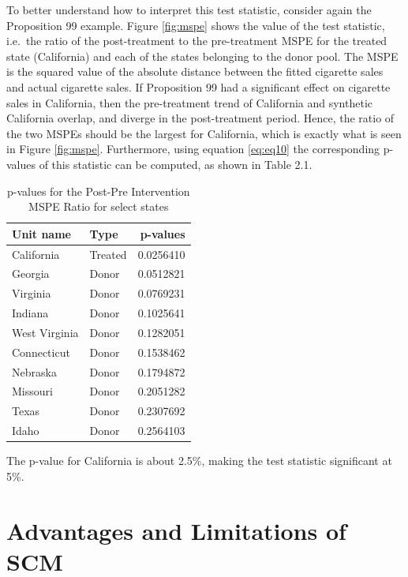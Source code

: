 \documentclass[12pt,nobind, a4paper]{reedthesis}
\begin{document}
 To better understand how to interpret this test statistic, consider again the Proposition 99 example. Figure \ref{fig:mspe} shows the value of the test statistic, i.e.~the ratio of the post-treatment to the pre-treatment MSPE for the treated state (California) and each of the states belonging to the donor pool. The MSPE is the squared value of the absolute distance between the fitted cigarette sales and actual cigarette sales. If Proposition 99 had a significant effect on cigarette sales in California, then the pre-treatment trend of California and synthetic California overlap, and diverge in the post-treatment period. Hence, the ratio of the two MSPEs should be the largest for California, which is exactly what is seen in Figure \ref{fig:mspe}. Furthermore, using equation \eqref{eq:eq10} the corresponding p-values of this statistic can be computed, as shown in Table 2.1.
 \begin{table}[h!!]
 \centering
 \begin{tabular}{llr}
 \hline
 \hline
 \textbf{Unit name} & \textbf{Type}&\textbf{p-values}\\
 \hline
 \hline
 California & Treated & 0.0256410\\
 \hline
 Georgia & Donor & 0.0512821\\
 \hline
 Virginia & Donor & 0.0769231\\
 \hline
 Indiana & Donor & 0.1025641\\
 \hline
 West Virginia & Donor & 0.1282051\\
 \hline
 Connecticut & Donor & 0.1538462\\
 \hline
 Nebraska & Donor & 0.1794872\\
 \hline
 Missouri & Donor & 0.2051282\\
 \hline
 Texas & Donor & 0.2307692\\
 \hline
 Idaho & Donor & 0.2564103\\
 \hline
 \end{tabular}
 \label{tab:tab1}
 \caption{p-values for the Post-Pre Intervention MSPE Ratio for select states}
 \end{table}
 The p-value for California is about 2.5\%, making the test statistic significant at 5\%.

 \hypertarget{advantages-and-limitations-of-scm}{%
 \section{Advantages and Limitations of SCM}\label{advantages-and-limitations-of-scm}}
\end{document}
